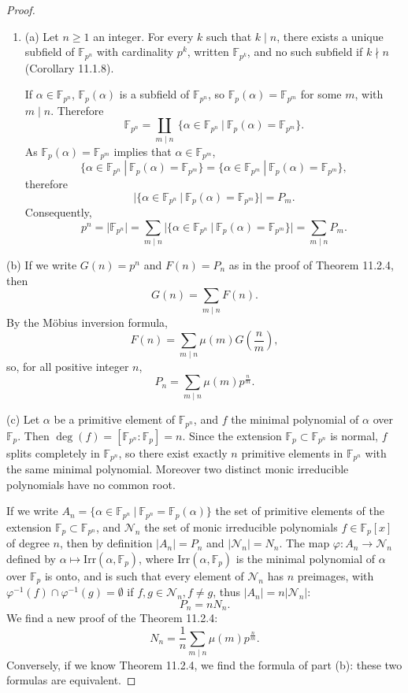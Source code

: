 \documentclass[11pt,a4paper]{article}
\newcommand{\be} {\begin{enumerate}}
\newcommand{\ee} {\end{enumerate}}
\newcommand{\F}{\mathbb{F}}
\begin{document}
\begin{proof}
\be
\item[(a)] Let $n\geq 1$ an integer. For every $k$ such that $k \mid n$, there exists a unique subfield of $\F_{p^n}$ with cardinality $p^k$, written $\F_{p^k}$, and no such subfield if $k\nmid n$ (Corollary 11.1.8).

If $\alpha \in \F_{p^n}$, $\F_p(\alpha)$ is a subfield of $\F_{p^n}$, so $\F_p(\alpha) = \F_{p^m}$ for some $m$, with $m\mid n$. Therefore
$$\F_{p^n} = \coprod_{m\mid n}\ \{\alpha \in \F_{p^n} \ |\ \F_p(\alpha) = \F_{p^m}\}.  $$
As $\F_p(\alpha) =  \F_{p^m}$ implies that $\alpha \in \F_{p^m}$,
$$\{\alpha \in \F_{p^n} \ |\ \F_p(\alpha) = \F_{p^m}\} = \{\alpha \in \F_{p^m} \ |\ \F_p(\alpha) = \F_{p^m}\},$$
therefore 
$$ {\big |} \{\alpha \in \F_{p^n} \ |\ \F_p(\alpha) = \F_{p^m}\}{\big |} = P_m.$$
Consequently,
$$p^n = {\big |} \F_{p^n}{\big |} = \sum_{m\mid n} {\big |}  \{\alpha \in \F_{p^n} \ |\ \F_p(\alpha) = \F_{p^m}\} {\big |} = \sum_{m \mid n} P_m.$$
\ee

\item[(b)] If we write $G(n) = p^n$ and $F(n) = P_n$ as in the proof of Theorem 11.2.4, then
$$G(n) = \sum_{m\mid n} F(n).$$
By the M\"obius inversion formula,
$$F(n) = \sum_{m\mid n} \mu(m) G\left(\frac{n}{m}\right),$$
so, for all positive integer $n$,
$$P_n = \sum_{m \mid n} \mu(m) p^{\frac{n}{m}}.$$

\item[(c)] Let $\alpha$ be a primitive element of $\F_{p^n}$, and $f$ the minimal polynomial of $\alpha$ over $\F_p$. Then $\deg(f) = [\F_{p^n} : \F_p] = n$. Since the extension $\F_p \subset \F_{p^n}$ is normal, $f$ splits completely in $\F_{p^n}$, so there exist exactly $n$ primitive elements in $\F_{p^n}$ with the same minimal polynomial. Moreover two distinct monic irreducible polynomials have no common root.

If we write $A_n = \{\alpha \in \F_{p^n}\ | \ \F_{p^n} = \F_p(\alpha)\}$ the set of primitive elements of the extension $\F_p\subset \F_{p^n}$, and ${\mathcal N}_n$ the set of monic irreducible polynomials $f \in \F_p[x]$ of degree $n$, then by definition $|A_n| = P_n$ and $|{\mathcal N}_n| =N_n$. The map $\varphi : A_n \to {\mathcal N}_n$ defined by $\alpha \mapsto \mathrm{Irr}(\alpha,\F_p)$, where $\mathrm{Irr}(\alpha,\F_p)$ is the minimal polynomial of $\alpha$ over $\F_p$ is onto, and is such that every element of ${\mathcal N}_n$ has $n$ preimages, with $\varphi^{-1}(f) \cap \varphi^{-1}(g) = \emptyset$ if $f, g \in {\mathcal N_n}, f \ne g$, thus $|A_n| = n |\mathcal N_n|$:
$$P_n = n N_n.$$
We find a new proof of the Theorem 11.2.4:
$$N_n = \frac{1}{n} \sum_{m \mid n} \mu(m) p^{\frac{n}{m}}.$$
Conversely, if we know Theorem 11.2.4, we find the formula of part (b): these two formulas are equivalent.
\end{proof}
\end{document}
